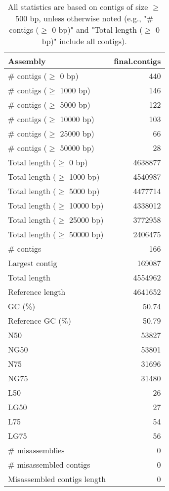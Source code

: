 \documentclass[12pt,a4paper]{article}
\begin{document}
\begin{table}[ht]
\begin{center}
\caption{All statistics are based on contigs of size $\geq$ 500 bp, unless otherwise noted (e.g., "\# contigs ($\geq$ 0 bp)" and "Total length ($\geq$ 0 bp)" include all contigs).}
\begin{tabular}{|l*{1}{|r}|}
\hline
Assembly & final.contigs \\ \hline
\# contigs ($\geq$ 0 bp) & 440 \\ \hline
\# contigs ($\geq$ 1000 bp) & 146 \\ \hline
\# contigs ($\geq$ 5000 bp) & 122 \\ \hline
\# contigs ($\geq$ 10000 bp) & 103 \\ \hline
\# contigs ($\geq$ 25000 bp) & 66 \\ \hline
\# contigs ($\geq$ 50000 bp) & 28 \\ \hline
Total length ($\geq$ 0 bp) & 4638877 \\ \hline
Total length ($\geq$ 1000 bp) & 4540987 \\ \hline
Total length ($\geq$ 5000 bp) & 4477714 \\ \hline
Total length ($\geq$ 10000 bp) & 4338012 \\ \hline
Total length ($\geq$ 25000 bp) & 3772958 \\ \hline
Total length ($\geq$ 50000 bp) & 2406475 \\ \hline
\# contigs & 166 \\ \hline
Largest contig & 169087 \\ \hline
Total length & 4554962 \\ \hline
Reference length & 4641652 \\ \hline
GC (\%) & 50.74 \\ \hline
Reference GC (\%) & 50.79 \\ \hline
N50 & 53827 \\ \hline
NG50 & 53801 \\ \hline
N75 & 31696 \\ \hline
NG75 & 31480 \\ \hline
L50 & 26 \\ \hline
LG50 & 27 \\ \hline
L75 & 54 \\ \hline
LG75 & 56 \\ \hline
\# misassemblies & 0 \\ \hline
\# misassembled contigs & 0 \\ \hline
Misassembled contigs length & 0 \\ \hline

\end{tabular}
\end{center}
\end{table}
\end{document}

